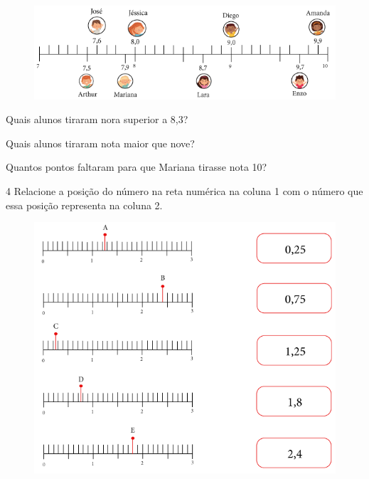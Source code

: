 \begin{figure}[htpb!]
\includegraphics[width=\textwidth]{../ilustracoes/MAT5/SAEB_5ANO_MAT_figura87.png}
\end{figure}

\begin{escolha}
\item
  Quais alunos tiraram nora superior a 8,3?

\bigskip
\bigskip
\bigskip

\item
  Quais alunos tiraram nota maior que nove?

\bigskip
\bigskip
\bigskip

\item
  Quantos pontos faltaram para que Mariana tirasse nota 10?

\bigskip
\bigskip
\bigskip
\end{escolha}

\pagebreak
\num{4} Relacione a posição do número na reta numérica na coluna 1 com o
número que essa posição representa na coluna 2.

\begin{figure}[htpb!]
\centering
\includegraphics[width=.8\textwidth]{../ilustracoes/MAT5/SAEB_5ANO_MAT_figura88.png}
\end{figure}

